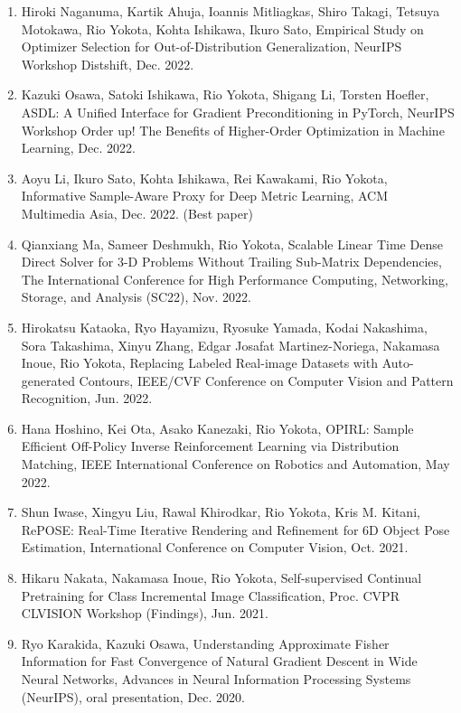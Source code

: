 \documentclass[margin,line]{cv}
\begin{document}
\begin{resume}
\begin{enumerate}
\item Hiroki Naganuma, Kartik Ahuja, Ioannis Mitliagkas, Shiro Takagi, Tetsuya Motokawa, Rio Yokota, Kohta Ishikawa, Ikuro Sato, Empirical Study on Optimizer Selection for Out-of-Distribution Generalization, NeurIPS Workshop Distshift, Dec. 2022.

\item Kazuki Osawa, Satoki Ishikawa, Rio Yokota, Shigang Li, Torsten Hoefler, ASDL: A Unified Interface for Gradient Preconditioning in PyTorch, NeurIPS Workshop Order up! The Benefits of Higher-Order Optimization in Machine Learning, Dec. 2022.

\item Aoyu Li, Ikuro Sato, Kohta Ishikawa, Rei Kawakami, Rio Yokota, Informative Sample-Aware Proxy for Deep Metric Learning, ACM Multimedia Asia, Dec. 2022. (Best paper)

\item Qianxiang Ma, Sameer Deshmukh, Rio Yokota, Scalable Linear Time Dense Direct Solver for 3-D Problems Without Trailing Sub-Matrix Dependencies, The International Conference for High Performance Computing, Networking, Storage, and Analysis (SC22), Nov. 2022.

\item Hirokatsu Kataoka, Ryo Hayamizu, Ryosuke Yamada, Kodai Nakashima, Sora Takashima, Xinyu Zhang, Edgar Josafat Martinez-Noriega, Nakamasa Inoue, Rio Yokota, Replacing Labeled Real-image Datasets with Auto-generated Contours, IEEE/CVF Conference on Computer Vision and Pattern Recognition, Jun. 2022.

\item Hana Hoshino, Kei Ota, Asako Kanezaki, Rio Yokota, OPIRL: Sample Efficient Off-Policy Inverse Reinforcement Learning via Distribution Matching, IEEE International Conference on Robotics and Automation, May 2022.

\item Shun Iwase, Xingyu Liu, Rawal Khirodkar, Rio Yokota, Kris M. Kitani, RePOSE: Real-Time Iterative Rendering and Refinement for 6D Object Pose Estimation, International Conference on Computer Vision, Oct. 2021.

\item Hikaru Nakata, Nakamasa Inoue, Rio Yokota, Self-supervised Continual Pretraining for Class Incremental Image Classification, Proc. CVPR CLVISION Workshop (Findings), Jun. 2021.

\item Ryo Karakida, Kazuki Osawa, Understanding Approximate Fisher Information for Fast Convergence of Natural Gradient Descent in Wide Neural Networks, Advances in Neural Information Processing Systems (NeurIPS), oral presentation, Dec. 2020.


\end{enumerate}
\end{resume}
\end{document}
